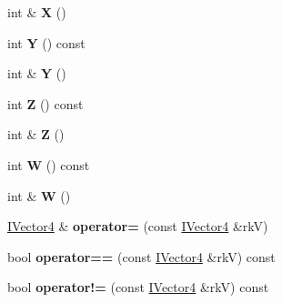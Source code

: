 \begin{DoxyCompactItemize}
\item 
int \& {\bfseries X} ()\hypertarget{class_magnum_1_1_i_vector4_ac0a1cd736bc371971488bec5e8f139ba}{}\label{class_magnum_1_1_i_vector4_ac0a1cd736bc371971488bec5e8f139ba}

\item 
int {\bfseries Y} () const \hypertarget{class_magnum_1_1_i_vector4_a425b6d2d69913c09faafb0665e80a4ca}{}\label{class_magnum_1_1_i_vector4_a425b6d2d69913c09faafb0665e80a4ca}

\item 
int \& {\bfseries Y} ()\hypertarget{class_magnum_1_1_i_vector4_a3a4d6d9006e744ab341617e880fbd517}{}\label{class_magnum_1_1_i_vector4_a3a4d6d9006e744ab341617e880fbd517}

\item 
int {\bfseries Z} () const \hypertarget{class_magnum_1_1_i_vector4_a73788c63754dd9ebfcbeea65a98e72bc}{}\label{class_magnum_1_1_i_vector4_a73788c63754dd9ebfcbeea65a98e72bc}

\item 
int \& {\bfseries Z} ()\hypertarget{class_magnum_1_1_i_vector4_aeb8a42e0fbef3fca7b5fcd97a149c91f}{}\label{class_magnum_1_1_i_vector4_aeb8a42e0fbef3fca7b5fcd97a149c91f}

\item 
int {\bfseries W} () const \hypertarget{class_magnum_1_1_i_vector4_a55bbd40f19b35fa7dae8080c42fc1bee}{}\label{class_magnum_1_1_i_vector4_a55bbd40f19b35fa7dae8080c42fc1bee}

\item 
int \& {\bfseries W} ()\hypertarget{class_magnum_1_1_i_vector4_aeefd4a4cb022b56277d8e8cdf32ea13d}{}\label{class_magnum_1_1_i_vector4_aeefd4a4cb022b56277d8e8cdf32ea13d}

\item 
\hyperlink{class_magnum_1_1_i_vector4}{I\+Vector4} \& {\bfseries operator=} (const \hyperlink{class_magnum_1_1_i_vector4}{I\+Vector4} \&rkV)\hypertarget{class_magnum_1_1_i_vector4_a2dc2406ba9332defdf932fc1e27bb95b}{}\label{class_magnum_1_1_i_vector4_a2dc2406ba9332defdf932fc1e27bb95b}

\item 
bool {\bfseries operator==} (const \hyperlink{class_magnum_1_1_i_vector4}{I\+Vector4} \&rkV) const \hypertarget{class_magnum_1_1_i_vector4_ac6e21deb8e50e61f9c60fdf3ae351130}{}\label{class_magnum_1_1_i_vector4_ac6e21deb8e50e61f9c60fdf3ae351130}

\item 
bool {\bfseries operator!=} (const \hyperlink{class_magnum_1_1_i_vector4}{I\+Vector4} \&rkV) const \hypertarget{class_magnum_1_1_i_vector4_a9004cdee00de11264cb4b4449ae854a6}{}\label{class_magnum_1_1_i_vector4_a9004cdee00de11264cb4b4449ae854a6}


\end{DoxyCompactItemize}
